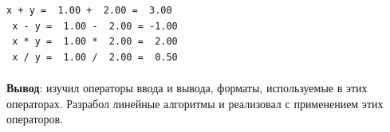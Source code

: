 \documentclass[12pt, a4paper, simple]{eskdtext}
\begin{document}
\begin{lstlisting}[name=Вывод в консоль]
 x + y =  1.00 +  2.00 =  3.00
 x - y =  1.00 -  2.00 = -1.00
 x * y =  1.00 *  2.00 =  2.00
 x / y =  1.00 /  2.00 =  0.50
\end{lstlisting}


\paragraph{} \textbf{Вывод}:
изучил операторы ввода и вывода, форматы, используемые в этих операторах.
Разрабол линейные алгоритмы и реализовал с применением этих операторов.


\newpage
\end{document}
